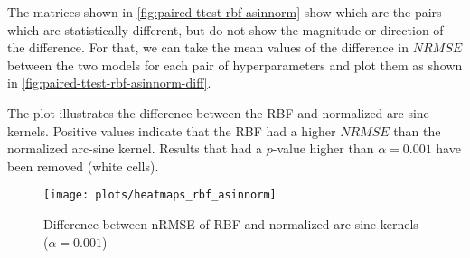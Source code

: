 The matrices shown in \cref{fig:paired-ttest-rbf-asinnorm} show which are the
pairs which are statistically different, but do not show the magnitude or
direction of the difference. For that, we can take the mean values of
the difference in $NRMSE$ between the two models for each pair of hyperparameters
and plot them as shown in \cref{fig:paired-ttest-rbf-asinnorm-diff}.

The plot illustrates the difference between the RBF and normalized arc-sine
kernels. Positive values indicate that the RBF had a higher $NRMSE$ than the
normalized arc-sine kernel. Results that had a $p$-value higher than $\alpha=0.001$
have been removed (white cells).

\begin{figure}[H]
    \texttt{[image: plots/heatmaps\_rbf\_asinnorm]}
    \caption{Difference between nRMSE of RBF and normalized arc-sine kernels ($\alpha=0.001$)}
    \label{fig:heatmaps-rbf-asinnorm}
\end{figure}

%
%
%
%
%
%

